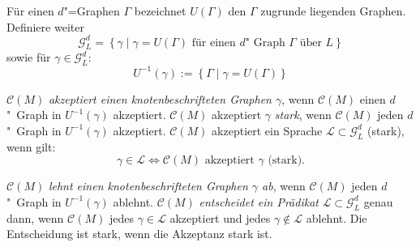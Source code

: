 \documentclass[11pt]{article}
\newcommand{\defWord}[1]{\emph{#1}}
\begin{document}
\begin{definition}
	Für einen $d$"=Graphen $\Gamma$ bezeichnet $U(\Gamma)$ den $\Gamma$ zugrunde liegenden Graphen. 
	Definiere weiter 
	\begin{displaymath}
		\mathcal{G}_L^d = \left\{\gamma \mid \gamma = U(\Gamma) \text{ für einen $d$"~Graph } \Gamma \text{ über } L\right\}
	\end{displaymath} sowie für $\gamma \in \mathcal{G}_L^d :$
	\begin{displaymath}
		 U^{-1}(\gamma) := \left\{\Gamma \mid \gamma = U\left(\Gamma\right)\right\}
	\end{displaymath}
	
	$\mathcal{C}(M)$ \defWord{akzeptiert einen knotenbeschrifteten Graphen $\gamma$}, wenn $\mathcal{C}(M)$ einen $d$"~Graph in $U^{-1}(\gamma)$ akzeptiert.
	$\mathcal{C}(M)$ akzeptiert $\gamma$ \defWord{stark}, wenn $\mathcal{C}(M)$ jeden $d$"~Graph in $U^{-1}(\gamma)$ akzeptiert.
	$\mathcal{C}(M)$ akzeptiert ein Sprache $\mathcal{L} \subset \mathcal{G}_L^d$ (stark), wenn gilt: 
	\begin{displaymath}
		\gamma \in \mathcal{L} \iff \mathcal{C}\left(M\right) \text{ akzeptiert } \gamma \text{ (stark).}
	\end{displaymath} 
	
	$\mathcal{C}(M)$ \defWord{lehnt einen knotenbeschrifteten Graphen $\gamma$ ab}, wenn $\mathcal{C}(M)$ jeden $d$"~Graph in $U^{-1}(\gamma)$ ablehnt.
	$\mathcal{C}(M)$ \defWord{entscheidet ein Prädikat} $\mathcal{L} \subset \mathcal{G}_L^d$ genau dann, wenn $\mathcal{C}(M)$ jedes $\gamma \in \mathcal{L}$  akzeptiert und jedes $\gamma \notin \mathcal{L}$ ablehnt.
	Die Entscheidung ist stark, wenn die Akzeptanz stark ist. 
\end{definition}
\end{document}

